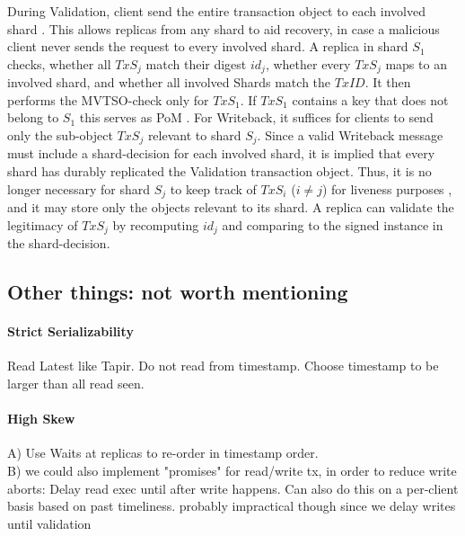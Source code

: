 During Validation, client send the entire transaction object to each involved shard . This allows replicas from any shard to aid recovery, in case a malicious client never sends the request to every involved shard. 
 A replica in shard $S_1$ checks, whether all $TxS_j$ match their digest $id_j$, whether every $TxS_j$ maps to an involved shard, and whether all involved Shards match the $TxID$. It then performs the MVTSO-check only for $TxS_1$. If $TxS_1$ contains a key that does not belong to $S_1$ this serves as PoM . 
For Writeback, it suffices for clients to send only the sub-object $TxS_j$ relevant to shard $S_j$. Since a valid Writeback message must include a shard-decision for each involved shard, it is implied that every shard has durably replicated the Validation transaction object. Thus, it is no longer necessary for shard $S_j$ to keep track of $TxS_i$ ($i \neq j$) for liveness purposes , and it may store only the objects relevant to its shard. A replica can validate the legitimacy of $TxS_j$ by recomputing $id_j$ and comparing to the signed instance in the shard-decision.\\
 




\subsection{Other things: not worth mentioning}

\paragraph{Strict Serializability}
Read Latest like Tapir. Do not read from timestamp. Choose timestamp to be larger than all read seen. 

\paragraph{High Skew}
A) Use Waits at replicas to re-order in timestamp order. \\
B) we could also implement "promises" for read/write tx, in order to reduce write aborts: Delay read exec until after write happens. Can also do this on a per-client basis based on past timeliness. probably impractical though since we delay writes until validation

